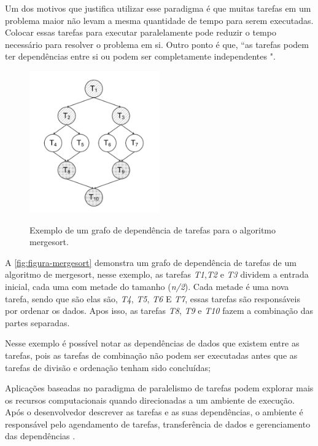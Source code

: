 Um dos motivos que justifica utilizar esse paradigma é que muitas tarefas em um problema maior não levam a mesma quantidade de tempo para serem executadas.
Colocar essas tarefas para executar paralelamente pode reduzir o tempo necessário para resolver o problema em si.
Outro ponto é que, “as tarefas podem ter dependências entre si ou podem ser completamente independentes \cite{pinto2013escalonamento}".

\begin{figure}[!htb]
    \centering
    \caption{Exemplo de um grafo de dependência de tarefas para o algoritmo mergesort.}
    \includegraphics[width=0.5\textwidth]{./dados/figuras/mergesort}
    \label{fig:figura-mergesort}
\end{figure}

A \autoref{fig:figura-mergesort} demonstra um grafo de dependência de tarefas de um algoritmo de mergesort, nesse exemplo, as tarefas \emph{T1},\emph{T2} e \emph{T3} dividem a entrada inicial, cada uma com metade do tamanho (\emph{n/2}).
Cada metade é uma nova tarefa, sendo que são elas são, \emph{T4}, \emph{T5}, \emph{T6} E \emph{T7}, essas tarefas são responsáveis por ordenar os dados.
Apos isso, as tarefas \emph{T8}, \emph{T9} e \emph{T10} fazem a combinação das partes separadas.

Nesse exemplo é possível notar as dependências de dados que existem entre as tarefas, pois as tarefas de combinação não podem ser executadas antes que as tarefas de divisão e ordenação tenham sido concluídas;

Aplicações baseadas no paradigma de paralelismo de tarefas podem explorar mais os recursos computacionais quando direcionadas a um ambiente de execução.
Após o desenvolvedor descrever as tarefas e as suas dependências, o ambiente é responsável pelo agendamento de tarefas, transferência de dados e gerenciamento das dependências \cite{pinto2017visual}.

